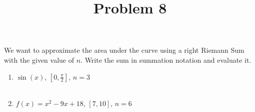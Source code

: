 \documentclass{ximera}
\title[Problem 8]{Problem 8}
\begin{document}
\begin{abstract} \end{abstract}
\maketitle

\begin{problem}
We want to approximate the area under the curve  using a right Riemann Sum with the given value of $n$. Write the sum in summation notation and evaluate it.
	\begin{enumerate}
	\item  $\sin (x)$, \; $\left[ 0, \frac{\pi}{2} \right]$, \; $n=3$ \\ \\

\item  $f(x) = x^2 - 9x + 18$, \; $[7,10]$, \; $n=6$
		

	\end{enumerate}

\end{problem}
\end{document}
